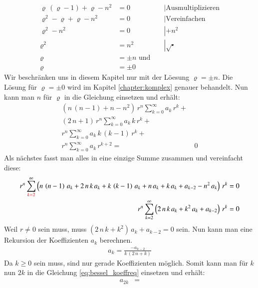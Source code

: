 \begin{refsection}
\begin{align*}
	\varrho \, \left( \varrho -1 \right) + \varrho - n^2 &= 0 && \left| \text{Ausmultiplizieren} \right. \\
	\varrho ^2 - \varrho + \varrho -n^2 &= 0 && \left| \text{Vereinfachen} \right.\\
	\varrho ^2 - n^2 &= 0 && \left| +n^2 \right.\\
	\varrho ^2 &= n^2 && \left| \sqrt{\centerdot} \right. \\
	\varrho &= \pm n \text{ und } \\
	\varrho &= \pm 0 %
\end{align*}
Wir beschr\"anken uns in diesem Kapitel nur mit der L\"oesung $\varrho = \pm n$. Die L\"osung f\"ur $\varrho = \pm 0$ wird im Kapitel \ref{chapter:komplex} genauer behandelt.
Nun kann man $n$ f\"ur $\varrho$ in die Gleichung einsetzen und erh\"alt:
\begin{align*}
	\left(
	n \, \left( n - 1 \right)
	+
	n
	-
	n^2
	\right)
	\, r^{n}
	\sum_{k=0}^{\infty} a_k \, r^k
	+ \\
	\left(	
	2 \, n
	+
	1
	\right)
	\, r^{n}
	\sum_{k=0}^{\infty} a_k \, k \, r^k
	+ \\
	r^{n}
	\sum_{k=0}^{\infty} a_k \, k \, \left( k - 1 \right) \, r^k
	+ \\
	r^{n}
	\sum_{k=0}^{\infty} a_k \, r^{k + 2}
	= & \, 0
\end{align*}
Als n\"achstes fasst man alles in eine einzige Summe zusammen und vereinfacht diese:
\begin{align*}
	r^n
	\sum_{\textcolor{red}{k=2}}^{\infty}
	\left( n \, \left( n - 1 \right) \, a_k
	+
	2 \, n \, k \, a_k
	+
	k \, \left( k - 1 \right) \, a_k
	+
	n \, a_k
	+
	k \, a_k
	+
	a_{k-2}
	-
	n^2 \, a_k
	\right)
	\, r^k
	= 0 \\
	r^n
	\sum_{k=2}^{\infty}
	\left(
	2 \, n \, k \, a_k
	+
	k^2 \, a_k
	+
	a_{k - 2}
	\right)
	\, r^k
	= 0
\end{align*}
Weil $r \neq 0$ sein muss, muss $ \left( 2 \, n \, k + k^2 \right) \, a_k + a_{k - 2} = 0$ sein.
Nun kann man eine Rekursion der Koeffizienten $a_k$ berechnen.
\begin{align}
	a_k
	=
	\frac
	{
		-a_{k - 2}
	}{
		k \, \left( 2 \, n + k \right)	
	}
	\label{eq:bessel_koeffreq}
\end{align}
Da $k \geq 0$ sein muss, sind nur gerade Koeffizienten m\"oglich. Somit kann man f\"ur $k$ nun $2k$ in die Gleichung \ref{eq:bessel_koeffreq} einsetzen und erh\"alt:
\begin{align*}
	a_{2k}
	&=

\end{align*}
\end{refsection}
